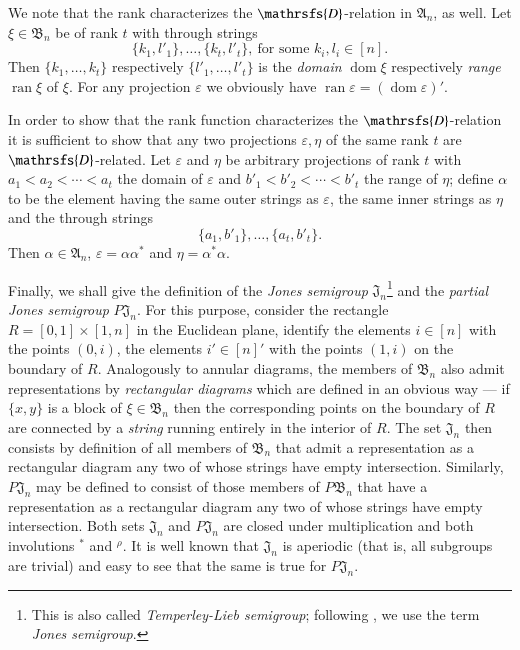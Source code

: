 \documentclass[preprint,1p,times]{elsarticle}
\DeclareMathOperator{\dom}{dom} \DeclareMathOperator{\ran}{ran}
\numberwithin{equation}{section}
\theoremstyle{remark}
\def\Dc{\mathrsfs{D}}
\def\al{\alpha}
\def\ep{\varepsilon}
\def\A{\mathfrak{A}}
\def\B{\mathfrak{B}}
\def\J{\mathfrak{J}}
\begin{document}
We note that the rank characterizes the $\Dc$-relation in $\A_n$, as well. Let
$\xi\in\B_n$ be of rank $t$ with through strings
$$\{k_1,l'_1\},\dots,\{k_t,l'_t\},\ \mbox{for some } k_i,l_i\in [n].$$
Then $\{k_1,\dots, k_t\}$ respectively $\{l'_1,\dots,l'_t\}$ is the \emph{domain} $\dom \xi$ respectively \emph{range}
$\ran \xi$ of $\xi$. For any projection $\ep$ we obviously have $\ran \ep=(\dom \ep)'$.

In order to show that the rank function characterizes the $\Dc$-relation it is sufficient to show that any two
projections $\ep, \eta$ of the same rank $t$ are $\Dc$-related. Let $\ep$ and $\eta$ be arbitrary projections of rank
$t$ with $a_1<a_2<\cdots<a_t$  the domain of $\ep$ and $b'_1<b'_2<\cdots<b'_t$ the range of $\eta$; define $\alpha$ to
be the element having the same outer strings as $\ep$, the same inner strings as $\eta$ and the through strings
$$\{a_1,b'_1\},\dots,\{a_t,b'_t\}.$$
Then $\alpha\in \A_n$, $\ep=\al\al^*$ and $\eta=\al^*\al$.

Finally, we shall give the definition of the \emph{Jones semigroup} $\J_n$\footnote{This is also called
\emph{Temperley-Lieb semigroup}; following \cite{fitzgerald}, we use the term \emph{Jones semigroup}.}
\cite{temperleylieb, fitzgerald} and the \emph{partial Jones semigroup} $P\J_n$. For this purpose, consider the
rectangle $R=[0,1]\times[1,n]$ in the Euclidean plane, identify the elements $i\in [n]$ with the points $(0,i)$, the
elements $i'\in [n]'$ with the points $(1,i)$ on the boundary of $R$. Analogously to annular diagrams, the members of
$\B_n$ also admit representations by \emph{rectangular diagrams} which are defined in an obvious way --- if $\{x,y\}$
is a block of $\xi\in \B_n$ then the corresponding points on the boundary of $R$ are connected by a \emph{string}
running entirely in the interior of $R$. The set $\J_n$ then consists by definition of all members of $\B_n$ that admit
a representation as a rectangular diagram any two of whose strings have empty intersection.  Similarly, $P\J_n$ may be
defined to consist of those members of $P\B_n$ that have a representation as a rectangular diagram any two of whose
strings have empty intersection. Both sets $\J_n$ and $P\J_n$ are closed under multiplication and both involutions $^*$
and $^\rho$. It is well known that $\J_n$ is aperiodic (that is, all subgroups are trivial) \cite{fitzgerald} and easy
to see that the same is true for $P\J_n$.
\end{document}

